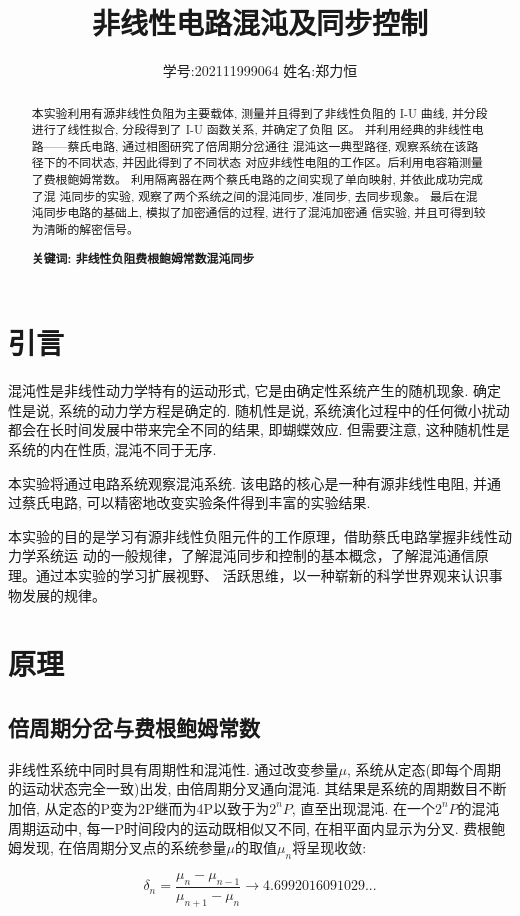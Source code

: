 \documentclass[12pt,a4paper]{article}
\title{\vspace{-4cm}\Large 非线性电路混沌及同步控制}  %
\author{\kaishu 学号:202111999064 \hspace{2cm} 姓名:郑力恒}   %
\date{}
\newcommand{\be}[1]{
    \begin{equation}
        #1
    \end{equation}
}
\begin{document}
\maketitle

\begin{abstract}
    本实验利用有源非线性负阻为主要载体, 测量并且得到了非线性负阻的
I-U 曲线, 并分段进行了线性拟合, 分段得到了 I-U 函数关系, 并确定了负阻
区。
并利用经典的非线性电路——蔡氏电路, 通过相图研究了倍周期分岔通往
混沌这一典型路径, 观察系统在该路径下的不同状态, 并因此得到了不同状态
对应非线性电阻的工作区。后利用电容箱测量了费根鲍姆常数。
利用隔离器在两个蔡氏电路的之间实现了单向映射, 并依此成功完成了混
沌同步的实验, 观察了两个系统之间的混沌同步, 准同步, 去同步现象。
最后在混沌同步电路的基础上, 模拟了加密通信的过程, 进行了混沌加密通
信实验, 并且可得到较为清晰的解密信号。

\bf{关键词: 非线性负阻\quad 费根鲍姆常数\quad 混沌同步}
\end{abstract}

\section{引言}
混沌性是非线性动力学特有的运动形式, 它是由确定性系统产生的随机现象. 确定性是说, 系统的动力学方程是确定的. 随机性是说, 系统演化过程中的任何微小扰动都会在长时间发展中带来完全不同的结果, 
即蝴蝶效应. 但需要注意, 这种随机性是系统的内在性质, 混沌不同于无序. 

本实验将通过电路系统观察混沌系统. 该电路的核心是一种有源非线性电阻, 并通过蔡氏电路, 可以精密地改变实验条件得到丰富的实验结果. 

本实验的目的是学习有源非线性负阻元件的工作原理，借助蔡氏电路掌握非线性动力学系统运
动的一般规律，了解混沌同步和控制的基本概念，了解混沌通信原理。通过本实验的学习扩展视野、
活跃思维，以一种崭新的科学世界观来认识事物发展的规律。

\section{原理}
\subsection{倍周期分岔与费根鲍姆常数}
非线性系统中同时具有周期性和混沌性. 通过改变参量$\mu$, 系统从定态(即每个周期的运动状态完全一致)出发, 由倍周期分叉通向混沌. 其结果是系统的周期数目不断加倍, 从定态的P变为2P继而为4P以致于为$2^n P$, 直至出现混沌. 在一个$2^n P$的混沌周期运动中, 每一P时间段内的运动既相似又不同, 在相平面内显示为分叉. 费根鲍姆发现, 
在倍周期分叉点的系统参量$\mu$的取值$\mu_{n}$将呈现收敛: 
\be{\delta_{n}=\frac{\mu_{n}-\mu_{n-1}}{\mu_{n+1}-\mu_{n}}\rightarrow 4.6992016091029...}
\end{document}
